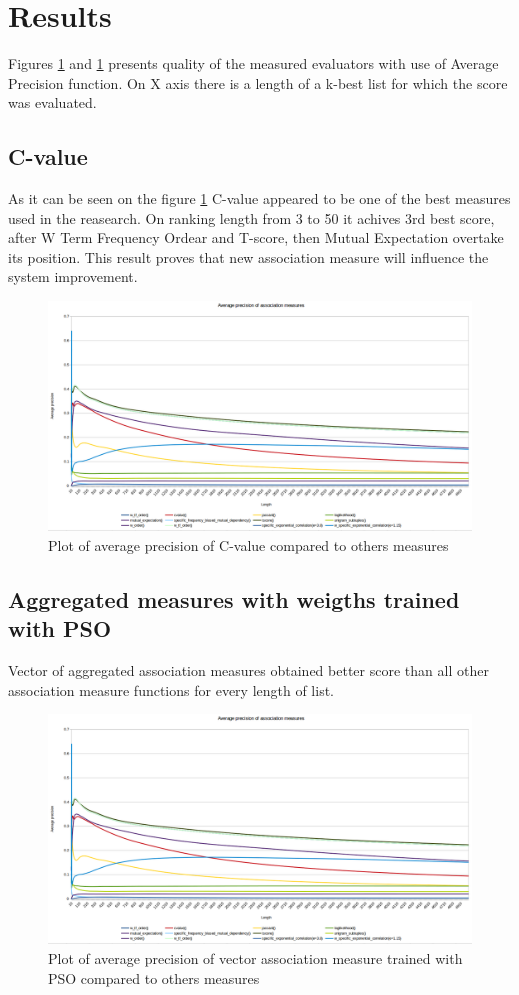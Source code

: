 \section{Results}
Figures \ref{cval_verif} and \ref{cval_verif} presents quality of the measured evaluators with use of Average Precision function. 
On X axis there is a length of a k-best list for which the score was evaluated.
\subsection{C-value}
As it can be seen on the figure \ref{cval_verif} C-value appeared to be one of the best measures used in the reasearch. 
On ranking length from 3 to 50 it achives 3rd best score, after W Term Frequency Ordear and T-score, then Mutual Expectation 
overtake its position. This result proves that new association measure will influence the system improvement.
\begin{figure}[ht]
    \centering
    \includegraphics[scale=0.32]{img/cval_verif.png}
    \caption{Plot of average precision of C-value compared to others measures}
    \label{cval_verif}
\end{figure}

\subsection{Aggregated measures with weigths trained with PSO}
Vector of aggregated association measures obtained better score than all other association measure functions for every length of list.

\begin{figure}[ht]
    \centering
    \includegraphics[scale=0.32]{img/cval_verif.png}
    \caption{Plot of average precision of vector association measure trained with PSO compared to others measures}
    \label{pso_verif}
\end{figure}